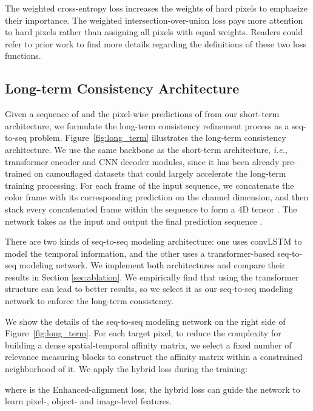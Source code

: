 \documentclass[10pt,twocolumn,letterpaper]{article}
\def\ie{\emph{i.e.}}
\def\figref#1{Figure~\ref{#1}}
\begin{document}
The weighted cross-entropy loss  increases the weights of hard pixels to emphasize their importance. The weighted intersection-over-union loss  pays more attention to hard pixels rather than assigning all pixels with equal weights. Readers could refer to prior work \cite{wei2020f3net} to find more details regarding the definitions of these two loss functions. 

\subsection{Long-term Consistency Architecture}
Given a sequence of  and the pixel-wise predictions of  from our short-term architecture, we formulate the long-term consistency refinement process as a seq-to-seq problem. 
\figref{fig:long_term} illustrates the long-term consistency architecture. We use the same backbone as the short-term architecture, \ie, transformer encoder and CNN decoder modules, since it has been already pre-trained on camouflaged datasets that could largely accelerate the long-term training processing. 
For each frame of the input sequence, we concatenate the color frame  with its corresponding prediction  on the channel dimension, and then stack every concatenated frame within the sequence to form a 4D tensor . The network takes  as the input and output the final prediction sequence .

There are two kinds of seq-to-seq modeling architecture: one uses convLSTM to model the temporal information, and the other uses a transformer-based seq-to-seq modeling network. We implement both architectures and compare their results in Section \ref{sec:ablation}. We empirically find that using the transformer structure can lead to better results, so we select it as our seq-to-seq modeling network to enforce the long-term consistency.

We show the details of the seq-to-seq modeling network on the right side of \figref{fig:long_term}. For each target pixel, to reduce the complexity for building a dense spatial-temporal affinity matrix, we select a fixed number of relevance measuring blocks to construct the affinity matrix within a constrained neighborhood of it.
We apply the hybrid loss \cite{21Fan_HybridLoss} during the training: 

where  is the Enhanced-alignment loss, the hybrid loss can guide the network to learn pixel-, object- and image-level features.
\end{document}
